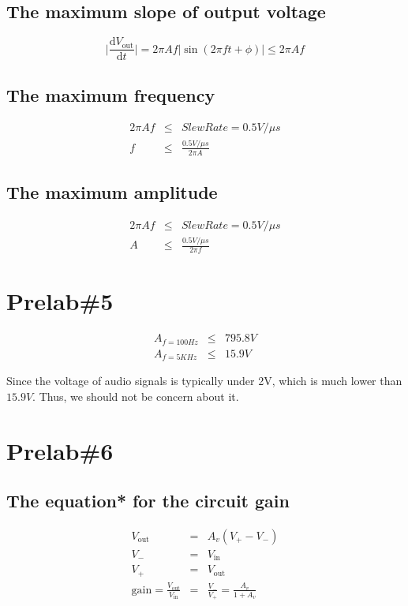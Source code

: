 \documentclass{IEEEtran}
\begin{document}
	\subsection{The maximum slope of output voltage}
	\begin{equation*}
		\bigg|\frac{\mathrm{d}V_{\mathrm{out}}}{\mathrm{d}t}\bigg| = 2\pi Af|\sin(2\pi ft+\phi)| \le 2\pi Af
	\end{equation*}
	\subsection{The maximum frequency}
	\begin{eqnarray*}
		2\pi Af & \le & SlewRate = 0.5\si{V/\mu s} \\
		f & \le & \frac{0.5\si{V/\mu s}}{2\pi A}
	\end{eqnarray*}
	\subsection{The maximum amplitude}
	\begin{eqnarray*}
		2\pi Af & \le & SlewRate = 0.5\si{V/\mu s} \\
		A & \le & \frac{0.5\si{V/\mu s}}{2\pi f}
	\end{eqnarray*}
	
	\section{\textbf{Prelab\#5}}
	\begin{eqnarray*}
		A_{f=100\si{Hz}} & \le & 795.8\si{V} \\
		A_{f=5\si{KHz}} & \le & 15.9\si{V}
	\end{eqnarray*}
		
	Since the voltage of audio signals is typically under 2V, which is much lower than $15.9\si{V}$. Thus, we should not be concern about it.
	
	\section{\textbf{Prelab\#6}}
	\subsection{The equation* for the circuit gain}
	\begin{eqnarray*}
		V_{\mathrm{out}} & = & A_v(V_+-V_-) \\
		V_- & = & V_{\mathrm{in}} \\
		V_+ & = & V_{\mathrm{out}} \\
		\mathrm{gain} = \frac{V_{\mathrm{out}}}{V_{\mathrm{in}}} & = & \frac{V_-}{V_+} = \frac{A_v}{1 + A_v}
	\end{eqnarray*}
\end{document}
